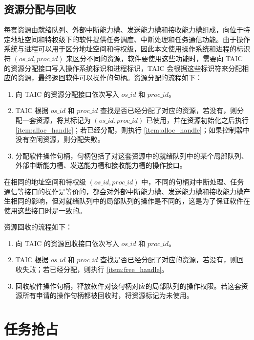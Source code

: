 \subsection{资源分配与回收}

每套资源由就绪队列、外部中断能力槽、发送能力槽和接收能力槽组成，向位于特定地址空间和特权级下的软件提供任务调度、中断处理和任务通信功能。由于操作系统与进程可以用于区分地址空间和特权级，因此本文使用操作系统和进程的标识符 $(os\_id, proc\_id)$ 来区分不同的资源，软件要使用这些功能时，需要向 TAIC 的资源分配接口写入操作系统标识和进程标识，TAIC 会根据这些标识符来分配相应的资源，最终返回软件可以操作的句柄。资源分配的流程如下：

\begin{enumerate}
  \item 向 TAIC 的资源分配接口依次写入 $os\_id$ 和 $proc\_id$。
  
  \item TAIC 根据 $os\_id$ 和 $proc\_id$ 查找是否已经分配了对应的资源，若没有，则分配一套资源，将其标记为 $(os\_id, proc\_id)$ 已使用，并在资源初始化之后执行 \ref{item:alloc_handle}；若已经分配，则执行 \ref{item:alloc_handle}；如果控制器中没有空闲资源，则分配失败。
  
  \item \label{item:alloc_handle} 分配软件操作句柄，句柄包括了对这套资源中的就绪队列中的某个局部队列、外部中断能力槽、发送能力槽和接收能力槽的操作接口。
\end{enumerate}

在相同的地址空间和特权级 $(os\_id, proc\_id)$ 中，不同的句柄对中断处理、任务通信等接口的操作是等价的，都会对外部中断能力槽、发送能力槽和接收能力槽产生相同的影响，但对就绪队列中的局部队列的操作是不同的，这是为了保证软件在使用这些接口时是一致的。

资源回收的流程如下：

\begin{enumerate}
  \item 向 TAIC 的资源回收接口依次写入 $os\_id$ 和 $proc\_id$。
  
  \item TAIC 根据 $os\_id$ 和 $proc\_id$ 查找是否已经分配了对应的资源，若没有，则回收失败；若已经分配，则执行 \ref{item:free_handle}。
  
  \item \label{item:free_handle} 回收软件操作句柄，释放软件对该句柄对应的局部队列的操作权限。若这套资源所有申请的操作句柄都被回收时，将资源标记为未使用。
\end{enumerate}

\section{任务抢占}

